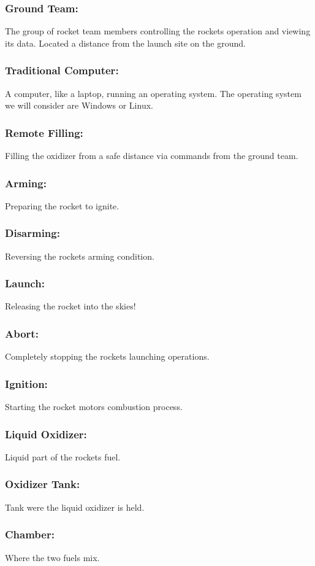\documentclass[10pt,draftclsnofoot,onecolumn,compsoc]{IEEEtran}
\begin{document}
\subsubsection{\bf Ground Team:} The group of rocket team members controlling the rockets operation and viewing its data. Located a distance from the launch site on the ground.
\subsubsection{\bf Traditional Computer:}A computer, like a laptop, running an operating system. The operating system we will consider are Windows or Linux.
\subsubsection{\bf Remote Filling:} Filling the oxidizer from a safe distance via commands from the ground team.
\subsubsection{\bf Arming:} Preparing the rocket to ignite.
\subsubsection{\bf Disarming:} Reversing the rockets arming condition. 
\subsubsection{\bf Launch:} Releasing the rocket into the skies! 
\subsubsection{\bf Abort:} Completely stopping the rockets launching operations.
\subsubsection{\bf Ignition:} Starting the rocket motors combustion process.
\subsubsection{\bf Liquid Oxidizer:}Liquid part of the rockets fuel. 
\subsubsection{\bf Oxidizer Tank:} Tank were the liquid oxidizer is held. 
\subsubsection{\bf Chamber:} Where the two fuels mix.
\end{document}

